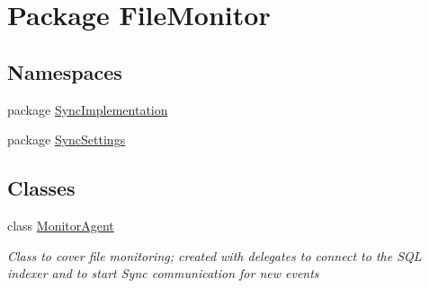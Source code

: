 \hypertarget{namespace_file_monitor}{\section{Package File\-Monitor}
\label{namespace_file_monitor}
}
\subsection*{Namespaces}
\begin{DoxyCompactItemize}
\item 
package \hyperlink{namespace_file_monitor_1_1_sync_implementation}{Sync\-Implementation}
\item 
package \hyperlink{namespace_file_monitor_1_1_sync_settings}{Sync\-Settings}
\end{DoxyCompactItemize}
\subsection*{Classes}
\begin{DoxyCompactItemize}
\item 
class \hyperlink{class_file_monitor_1_1_monitor_agent}{Monitor\-Agent}
\begin{DoxyCompactList}\small\item\em Class to cover file monitoring; created with delegates to connect to the S\-Q\-L indexer and to start Sync communication for new events \end{DoxyCompactList}\end{DoxyCompactItemize}
